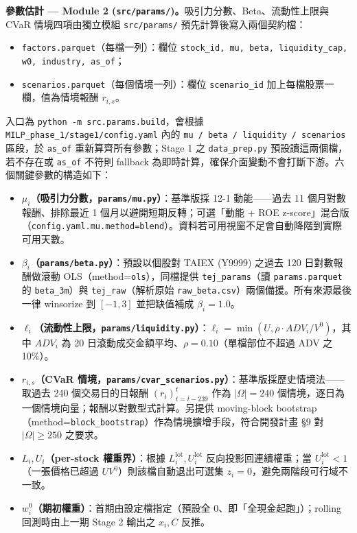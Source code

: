\documentclass[11pt,a4paper]{article}
\newenvironment{itemizeTight}{\begin{itemize}\vspace{-8pt}}{\end{itemize}\vspace{-8pt}}
\begin{document}
\textbf{參數估計 — Module 2 (\texttt{src/params/})。}{}吸引力分數、Beta、流動性上限與 CVaR 情境四項由獨立模組 \texttt{src/params/} 預先計算後寫入兩個契約檔：
\begin{itemizeTight}
    \item \texttt{factors.parquet}（每檔一列）：欄位 \texttt{stock\_id, mu, beta, liquidity\_cap, w0, industry, as\_of}；
    \item \texttt{scenarios.parquet}（每個情境一列）：欄位 \texttt{scenario\_id} 加上每檔股票一欄，值為情境報酬 $r_{i,s}$。
\end{itemizeTight}
入口為 \texttt{python -m src.params.build}，會根據 \texttt{MILP\_phase\_1/stage1/config.yaml} 內的 \texttt{mu / beta / liquidity / scenarios} 區段，於 \texttt{as\_of} 重新算齊所有參數；Stage 1 之 \texttt{data\_prep.py} 預設讀這兩個檔，若不存在或 \texttt{as\_of} 不符則 fallback 為即時計算，確保介面變動不會打斷下游。六個關鍵參數的構造如下：
\begin{itemizeTight}
    \item \textbf{$\mu_i$（吸引力分數，\texttt{params/mu.py}）}：基準版採 12-1 動能——過去 11 個月對數報酬、排除最近 1 個月以避開短期反轉；可選「動能 + ROE z-score」混合版（\texttt{config.yaml.mu.method=blend}）。資料若可用視窗不足會自動降階到實際可用天數。
    \item \textbf{$\beta_i$（\texttt{params/beta.py}）}：預設以個股對 TAIEX (Y9999) 之過去 120 日對數報酬做滾動 OLS（method=\texttt{ols}），同檔提供 \texttt{tej\_params}（讀 \texttt{params.parquet} 的 \texttt{beta\_3m}）與 \texttt{tej\_raw}（解析原始 \texttt{raw\_beta.csv}）兩個備援。所有來源最後一律 winsorize 到 $[-1, 3]$ 並把缺值補成 $\beta_i = 1.0$。
    \item \textbf{$\ell_i$（流動性上限，\texttt{params/liquidity.py}）}：$\ell_i = \min(U, \rho \cdot ADV_i / V^0)$，其中 $ADV_i$ 為 20 日滾動成交金額平均、$\rho = 0.10$（單檔部位不超過 ADV 之 10\%）。
    \item \textbf{$r_{i,s}$（CVaR 情境，\texttt{params/cvar\_scenarios.py}）}：基準版採歷史情境法——取過去 240 個交易日的日報酬 $(r_t)_{t=t-239}^{t}$ 作為 $|\Omega| = 240$ 個情境，逐日為一個情境向量；報酬以對數型式計算。另提供 moving-block bootstrap（method=\texttt{block\_bootstrap}）作為情境擴增手段，符合開發計畫 §9 對 $|\Omega| \geq 250$ 之要求。
    \item \textbf{$L_i, U_i$（per-stock 權重界）}：根據 $L_i^{\text{lot}}, U_i^{\text{lot}}$ 反向投影回連續權重；當 $U_i^{\text{lot}} < 1$（一張價格已超過 $U V^0$）則該檔自動退出可選集 $z_i = 0$，避免兩階段可行域不一致。
    \item \textbf{$w_i^0$（期初權重）}：首期由設定檔指定（預設全 0、即「全現金起跑」）；rolling 回測時由上一期 Stage 2 輸出之 $x_i, C$ 反推。
\end{itemizeTight}
\end{document}
